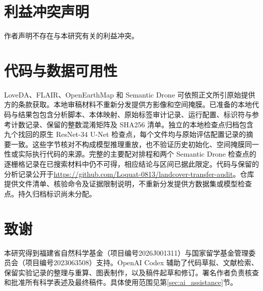 \section*{利益冲突声明}
作者声明不存在与本研究有关的利益冲突。

\section*{代码与数据可用性}
LoveDA、FLAIR、OpenEarthMap 和 Semantic Drone 可依照正文所引原始提供方的条款获取。本地审稿材料不重新分发提供方影像和空间掩膜。已准备的本地代码与结果包包含分析脚本、本体映射、原始标签审计记录、运行配置、标识符与参考计数记录、保留的整数混淆矩阵及 SHA256 清单。独立的本地检查点归档包含九个找回的原生 ResNet-34 U-Net 检查点，每个文件均与原始评估配置记录的摘要一致。这些字节核对不构成模型推理重放，也不验证历史初始化、空间掩膜同一性或实际执行代码的来源。完整的主要配对排程和两个 Semantic Drone 检查点的逐栅格记录在已搜索材料中仍不可得，相应结论与区间已据此限定。代码与保留的分析记录公开于\url{https://github.com/Loquat-0813/landcover-transfer-audit}。仓库提供文件清单、核验命令及证据限制说明，不重新分发提供方数据集或模型检查点。持久归档标识尚未分配。

\section*{致谢}
本研究得到福建省自然科学基金（项目编号2026J001311）与国家留学基金管理委员会（项目编号2023063508）支持。OpenAI Codex 辅助了代码草拟、文献检索、保留实验记录的整理与重算、图表制作，以及稿件起草和修订。署名作者负责核查和批准所有科学表述及最终稿件。具体使用范围见第\ref{sec:ai_assistance}节。
